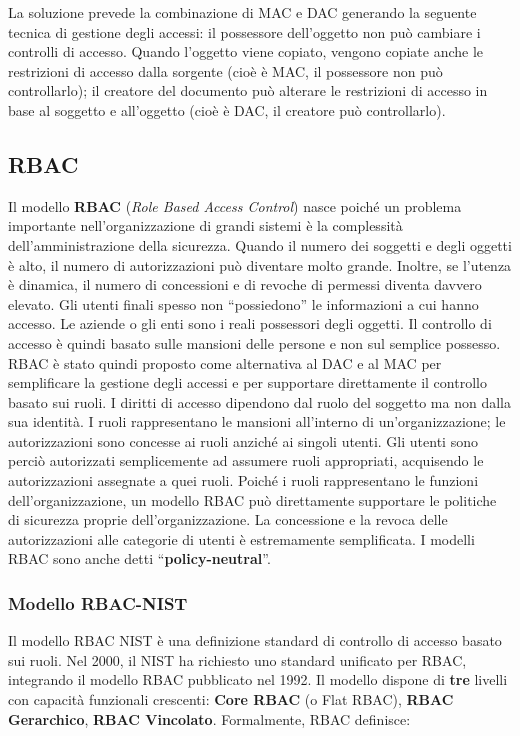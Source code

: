 La soluzione prevede la combinazione di MAC e DAC generando la seguente tecnica
di gestione degli accessi: il possessore dell'oggetto non può cambiare i
controlli di accesso. Quando l'oggetto
viene copiato, vengono copiate anche le restrizioni di accesso dalla sorgente
(cioè è MAC, il possessore non può controllarlo); il creatore del documento può
alterare le restrizioni di accesso in base al soggetto e all'oggetto
(cioè è DAC, il creatore può controllarlo).

\subsection{RBAC}

Il modello \textbf{RBAC} (\textit{Role Based Access Control}) nasce poiché un
problema importante nell'organizzazione di grandi sistemi è la complessità
dell'amministrazione della sicurezza.
Quando il numero dei soggetti e degli oggetti è alto, il numero di autorizzazioni
può diventare molto grande.
Inoltre, se l'utenza è dinamica, il numero di concessioni e di revoche di permessi
diventa davvero elevato. Gli utenti finali spesso non “possiedono” le informazioni
a cui hanno accesso. Le aziende o gli enti sono i reali possessori degli oggetti.
Il controllo di accesso è quindi basato sulle mansioni delle persone e non sul
semplice possesso.
RBAC è stato quindi proposto come alternativa al DAC e al MAC per semplificare
la gestione degli accessi e per supportare direttamente il controllo basato sui
ruoli.
I diritti di accesso dipendono dal ruolo del soggetto ma non dalla sua identità.
I ruoli rappresentano le mansioni all'interno di un'organizzazione;
le autorizzazioni sono concesse ai ruoli anziché ai
singoli utenti. Gli utenti sono perciò autorizzati semplicemente ad assumere ruoli
appropriati, acquisendo le autorizzazioni assegnate a quei ruoli.
Poiché i ruoli rappresentano le funzioni dell'organizzazione, un modello RBAC può
direttamente supportare le politiche di sicurezza proprie dell'organizzazione.
La concessione e la revoca delle
autorizzazioni alle categorie di utenti è estremamente semplificata.
I modelli RBAC sono anche detti “\textbf{policy-neutral}”.

\subsubsection{Modello RBAC-NIST}

Il modello RBAC NIST è una definizione standard di controllo di accesso basato
sui ruoli. Nel 2000, il NIST ha richiesto uno standard unificato per RBAC,
integrando il modello RBAC pubblicato nel 1992.
Il modello dispone di \textbf{tre} livelli con capacità funzionali crescenti:
\textbf{Core RBAC} (o Flat RBAC), \textbf{RBAC Gerarchico}, \textbf{RBAC Vincolato}.
Formalmente, RBAC definisce:

